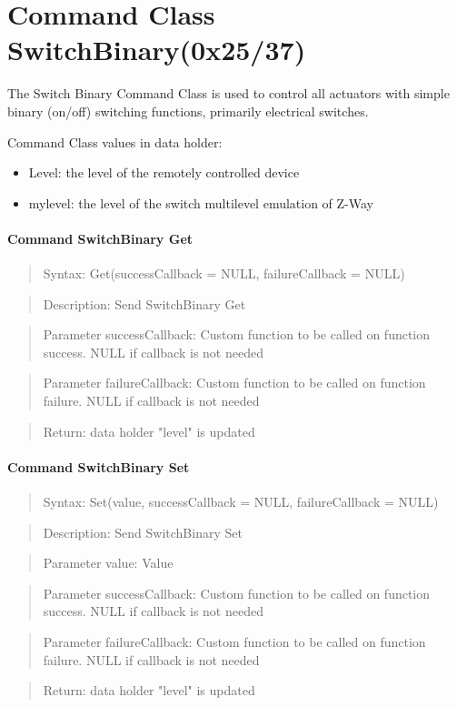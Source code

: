 \section{Command Class SwitchBinary(0x25/37)}

The Switch Binary Command Class is used to control all actuators with simple binary (on/off) switching functions, primarily electrical switches. 

Command Class values in data holder:
\begin{itemize}
\item Level: the level of the remotely controlled device
\item mylevel:  the level of the switch multilevel emulation of Z-Way
\end{itemize}

\paragraph {Command SwitchBinary Get}
\begin{quote} Syntax: Get(successCallback = NULL, failureCallback = NULL)\end{quote}
\begin{quote} Description: Send SwitchBinary Get\end{quote}
\begin{quote} Parameter successCallback: Custom function to be called on function success. NULL if callback is not needed\end{quote}
\begin{quote} Parameter failureCallback: Custom function to be called on function failure. NULL if callback is not needed\end{quote}
\begin{quote} Return: data holder "level" is updated\end{quote}

\paragraph {Command SwitchBinary Set}
\begin{quote} Syntax: Set(value, successCallback = NULL, failureCallback = NULL)\end{quote}
\begin{quote} Description: Send SwitchBinary Set\end{quote}
\begin{quote} Parameter value: Value\end{quote}
\begin{quote} Parameter successCallback: Custom function to be called on function success. NULL if callback is not needed\end{quote}
\begin{quote} Parameter failureCallback: Custom function to be called on function failure. NULL if callback is not needed\end{quote}
\begin{quote} Return: data holder "level" is updated\end{quote}

